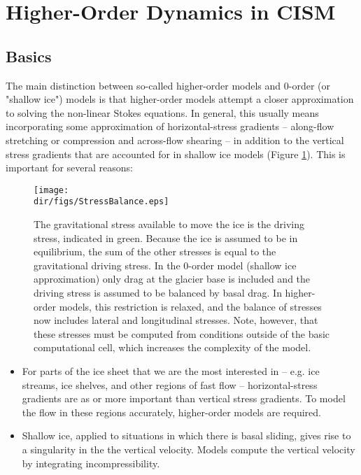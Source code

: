\label{ch:glissade}

\section{Higher-Order Dynamics in CISM}

\subsection{Basics}
The main distinction between so-called higher-order models and 0-order (or "shallow ice") models is that higher-order models attempt a closer approximation to solving the non-linear Stokes equations. In general, this usually means incorporating some approximation of horizontal-stress gradients -- along-flow stretching or compression and across-flow shearing -- in addition to the vertical stress gradients that are accounted for in shallow ice models (Figure \ref{fig:stressbalance}). This is important for several reasons:

\begin{figure}
  \begin{center}
    \texttt{[image: \\dir/figs/StressBalance.eps]}
  \end{center}
  \caption{The gravitational stress available to move the ice is the driving stress, indicated in green. Because the ice is assumed to be in equilibrium, the sum of the other stresses is equal to the gravitational driving stress. In the 0-order model (shallow ice approximation) only drag at the glacier base is included and the driving stress is assumed to be balanced by basal drag. In higher-order models, this restriction is relaxed, and the balance of stresses now includes lateral and longitudinal stresses. Note, however, that these stresses must be computed from conditions outside of the basic computational cell, which increases the complexity of the model.}
  \label{fig:stressbalance}
\end{figure} 

\begin{itemize}
\item For parts of the ice sheet that we are the most interested in -- e.g. ice streams, ice shelves, and other regions of fast flow -- horizontal-stress gradients are as or more important than vertical stress gradients. To model the flow in these regions accurately, higher-order models are required.
\item Shallow ice, applied to situations in which there is basal sliding, gives rise to a singularity in the the vertical velocity. Models compute the vertical velocity by integrating incompressibility.
\end{itemize}


